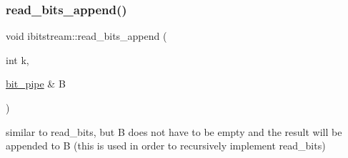 \subsubsection{\texorpdfstring{read\+\_\+bits\+\_\+append()}{read\_bits\_append()}}
{\footnotesize\ttfamily void ibitstream\+::read\+\_\+bits\+\_\+append (\begin{DoxyParamCaption}\item[{int}]{k,  }\item[{\hyperlink{classbit__pipe}{bit\+\_\+pipe} \&}]{B }\end{DoxyParamCaption})}



similar to read\+\_\+bits, but B does not have to be empty and the result will be appended to B (this is used in order to recursively implement read\+\_\+bits) 


